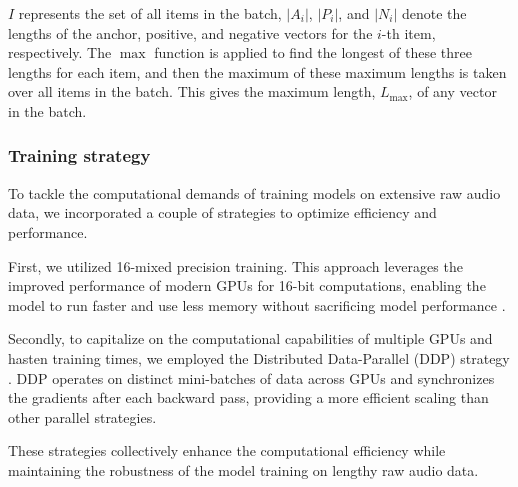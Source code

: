 $I$ represents the set of all items in the batch, $|A_i|$, $|P_i|$, and $|N_i|$ denote the lengths of the anchor, positive, and negative vectors for the $i$-th item, respectively. The $\max$ function is applied to find the longest of these three lengths for each item, and then the maximum of these maximum lengths is taken over all items in the batch. This gives the maximum length, $L_{\text{max}}$, of any vector in the batch.

\subsubsection{Training strategy}

To tackle the computational demands of training models on extensive raw audio data, we incorporated a couple of strategies to optimize efficiency and performance. 

First, we utilized 16-mixed precision training. This approach leverages the improved performance of modern GPUs for 16-bit computations, enabling the model to run faster and use less memory without sacrificing model performance \cite{Das2018MixedOperations}.

Secondly, to capitalize on the computational capabilities of multiple GPUs and hasten training times, we employed the Distributed Data-Parallel (DDP) strategy \cite{Li2020PyTorchTraining}. DDP operates on distinct mini-batches of data across GPUs and synchronizes the gradients after each backward pass, providing a more efficient scaling than other parallel strategies. 

These strategies collectively enhance the computational efficiency while maintaining the robustness of the model training on lengthy raw audio data.

\newpage